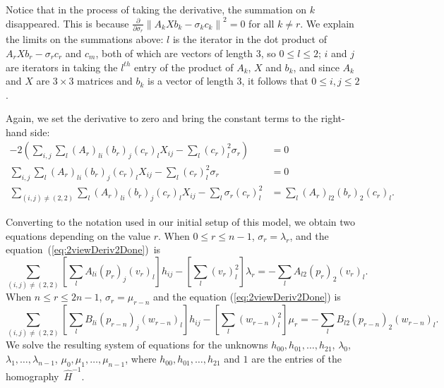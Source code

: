 \documentclass[11pt, oneside, reqno]{book}
\begin{document}
Notice that in the process of taking the derivative, the summation on $k$ disappeared. This is because $\frac{\partial}{\partial \sigma_r} \left\| A_k X b_k - \sigma_k c_k \right\|^2 = 0$ for all $k \not= r$. We explain the limits on the summations above: $l$ is the iterator in the dot product of $A_r X b_r - \sigma_r c_r$ and $c_m$, both of which are vectors of length 3, so $0 \le l \le 2$; $i$ and $j$ are iterators in taking the $l^{th}$ entry of the product of $A_k$, $X$ and $b_k$, and since $A_k$ and $X$ are $3\times 3$ matrices and $b_k$ is a vector of length 3, it follows that $0 \le i,j \le 2$.

Again, we set the derivative to zero and bring the constant terms to the right-hand side:
\begin{align}
-2 \left(
\sum_{i,j} \sum_l
\left(A_r\right)_{li} \left(b_r\right)_j \left(c_r\right)_l X_{ij}
-
\sum_l 
\left(c_r\right)_l^2 \sigma_r
\right) &= 0 \nonumber\\
\sum_{i,j} \sum_l
\left(A_r\right)_{li} \left(b_r\right)_j \left(c_r\right)_l X_{ij}
-
\sum_l 
\left(c_r\right)_l^2 \sigma_r &= 0 \nonumber\\
\sum_{(i,j) \not= (2,2)} \sum_l
\left(A_r\right)_{li} \left(b_r\right)_j \left(c_r\right)_l X_{ij}
-
\sum_l 
\sigma_r \left(c_r\right)_l^2 &= \sum_l
\left(A_r\right)_{l2} \left(b_r\right)_2 \left(c_r\right)_l. \label{eq:2viewDeriv2Done}
\end{align}

Converting to the notation used in our initial setup of this model, we obtain two equations depending on the value $r$. When $0 \le r \le n-1$, $\sigma_r=\lambda_r$, and the equation~(\ref{eq:2viewDeriv2Done})~is
\[
\sum_{(i,j) \not= (2,2)}
\left[
\sum_l A_{li} (p_r)_j (v_r)_l
\right] h_{ij}
- \left[ 
\sum_l (v_r)_l^2
\right] \lambda_r
=
-\sum_l A_{l2}(p_r)_2 (v_r)_l.
\]
When $n \le r \le 2n-1$, $\sigma_r =\mu_{r-n}$ and the equation (\ref{eq:2viewDeriv2Done}) is
\[
\sum_{(i,j) \not= (2,2)}
\left[
\sum_l B_{li} (p_{r-n})_j (w_{r-n})_l
\right] h_{ij}
- \left[ 
\sum_l (w_{r-n})_l^2
\right] \mu_r
=
-\sum_l B_{l2}(p_{r-n})_2 (w_{r-n})_l.
\]
We solve the resulting system of equations for the unknowns $h_{00}, h_{01}, \dots, h_{21}$, $\lambda_0$, $\lambda_1, \dots, \lambda_{n-1}$, $\mu_0, \mu_1, \dots, \mu_{n-1}$, where $h_{00}, h_{01}, \dots, h_{21}$ and $1$ are the entries of the homography~$\widehat{H}^{-1}$.
\end{document}
